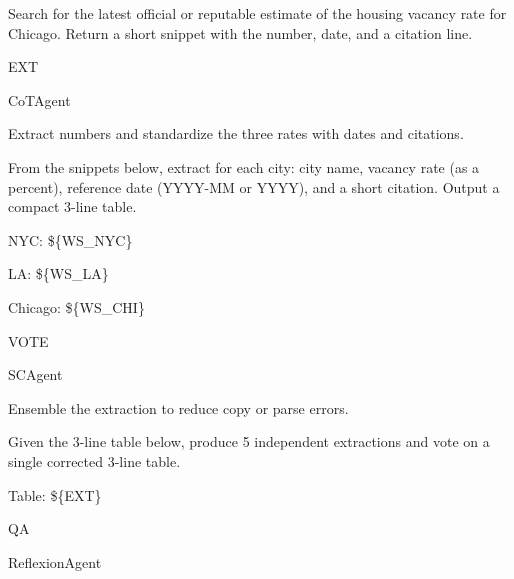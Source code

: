 \begin{userprompt}[title={User Prompt}]
\quad{}

\qquad{}
Search for the latest official or reputable estimate of the housing vacancy rate for Chicago. Return a short snippet with the number, date, and a citation line.

\quad{}



\quad{}EXT

\quad{}CoTAgent

\quad{}
Extract numbers and standardize the three rates with dates and citations.

\quad{}

\qquad{}
From the snippets below, extract for each city: city name, vacancy rate (as a percent), reference date (YYYY-MM or YYYY), and a short citation. Output a compact 3-line table.

NYC:
\$\{WS\_NYC\}

LA:
\$\{WS\_LA\}

Chicago:
\$\{WS\_CHI\}

\quad{}



\quad{}VOTE

\quad{}SCAgent

\quad{}
Ensemble the extraction to reduce copy or parse errors.

\quad{}

\qquad{}
Given the 3-line table below, produce 5 independent extractions and vote on a single corrected 3-line table.

Table:
\$\{EXT\}

\quad{}



\quad{}QA

\quad{}ReflexionAgent


\end{userprompt}
